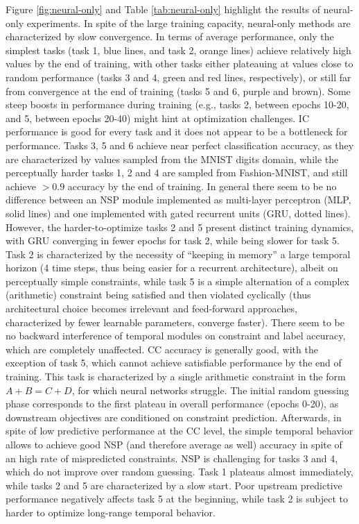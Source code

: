 Figure \ref{fig:neural-only} and Table \ref{tab:neural-only} highlight the results of neural-only experiments.
In spite of the large training capacity, neural-only methods are characterized by slow convergence. In terms of average performance, only the simplest tasks (task 1, blue lines, and task 2, orange lines) achieve relatively high values by the end of training, with other tasks either plateauing at values close to random performance (tasks 3 and 4, green and red lines, respectively), or still far from convergence at the end of training (tasks 5 and 6, purple and brown). Some steep boosts in performance during training (e.g., tasks 2, between epochs 10-20, and 5, between epochs 20-40) might hint at optimization challenges.
%
\textsc{IC} performance is good for every task and it does not appear to be a bottleneck for performance. Tasks 3, 5 and 6 achieve near perfect classification accuracy, as they are characterized by values sampled from the MNIST digits domain, while the perceptually harder tasks 1, 2 and 4 are sampled from Fashion-MNIST, and still achieve $>0.9$ accuracy by the end of training.
%
In general there seem to be no difference between an \textsc{NSP} module implemented as multi-layer perceptron (MLP, solid lines) and one implemented with gated recurrent units (GRU, dotted lines). However, the harder-to-optimize tasks 2 and 5 present distinct training dynamics, with GRU converging in fewer epochs for task 2, while being slower for task 5. Task 2 is characterized by the necessity of ``keeping in memory'' a large temporal horizon (4 time steps, thus being easier for a recurrent architecture), albeit on perceptually simple constraints, while task 5 is a simple alternation of a complex (arithmetic) constraint being satisfied and then violated cyclically (thus architectural choice becomes irrelevant and feed-forward approaches, characterized by fewer learnable parameters, converge faster). There seem to be no backward interference of temporal modules on constraint and label accuracy, which are completely unaffected.
%
\textsc{CC} accuracy is generally good, with the exception of task 5, which cannot achieve satisfiable performance by the end of training. This task is characterized by a single arithmetic constraint in the form $A + B = C + D$, for which neural networks struggle. The initial random guessing phase corresponds to the first plateau in overall performance (epochs 0-20), as downstream objectives are conditioned on constraint prediction. Afterwards, in spite of low predictive performance at the \textsc{CC} level, the simple temporal behavior allows to achieve good \textsc{NSP} (and therefore average as well) accuracy in spite of an high rate of mispredicted constraints.
%
\textsc{NSP} is challenging for tasks 3 and 4, which do not improve over random guessing. Task 1 plateaus almost immediately, while tasks 2 and 5 are characterized by a slow start. Poor upstream predictive performance negatively affects task 5 at the beginning, while task 2 is subject to harder to optimize long-range temporal behavior.

